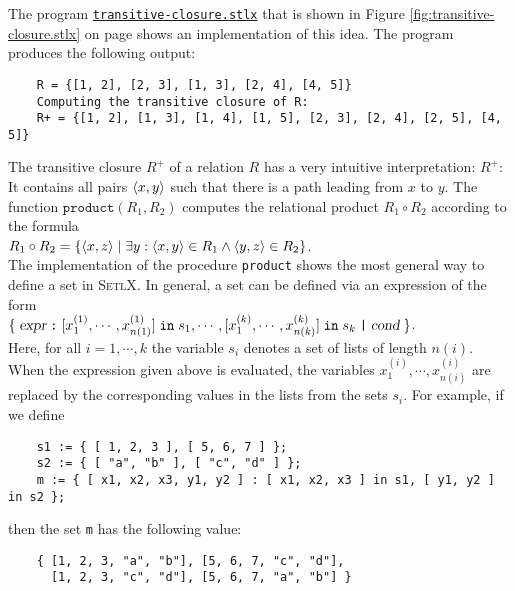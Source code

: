 \noindent
The program 
\href{https://github.com/karlstroetmann/Logik/blob/master/SetlX/transitive-closure.stlx}{\texttt{transitive-closure.stlx}}
that is shown in Figure
\ref{fig:transitive-closure.stlx} on page \pageref{fig:transitive-closure.stlx} shows an implementation of this idea.
The program produces the following output:
\begin{verbatim}
    R = {[1, 2], [2, 3], [1, 3], [2, 4], [4, 5]}
    Computing the transitive closure of R:
    R+ = {[1, 2], [1, 3], [1, 4], [1, 5], [2, 3], [2, 4], [2, 5], [4, 5]}
\end{verbatim}
The transitive closure $R^+$ of a relation $R$ has a very intuitive interpretation:
$R^+$:  It contains all pairs $\pair(x,y)$ such that there is a path leading from 
$x$ to $y$.  
The function $\texttt{product}(R_1, R_2)$ computes the relational product $R_1\circ R_2$ 
according to the formula
\\[0.2cm]
\hspace*{1.3cm}
$R_1 \circ R_2 = \{ \langle x, z \rangle \mid \exists y: \pair(x,y) \in R_1 \wedge \pair(y,z) \in R_2 \}$.
\\[0.2cm]
The implementation of the procedure \texttt{product} shows the most general way to define a set in
\textsc{SetlX}.  In general, a set can be defined via an expression of the form
\\[0.2cm]
\hspace*{1.3cm}
$\{\; \textsl{expr} \;\texttt{:}\; [x^{(1)}_1, \cdots, x^{(1)}_{n(1)}] \;\texttt{in}\; s_1,
     \cdots, [x^{(k)}_1, \cdots, x^{(k)}_{n(k)}] \;\texttt{in}\; s_k \;\texttt{|}\;
     \textsl{cond} \;\}
$.
\\[0.2cm]
Here, for all $i=1, \cdots, k$ the variable $s_i$ denotes a set of lists of length $n(i)$.  When the
expression given above is evaluated, the variables $x^{(i)}_1, \cdots, x^{(i)}_{n(i)}$ are replaced
by the corresponding values in the lists from the sets  $s_i$.  For example, if we define
\begin{verbatim}
    s1 := { [ 1, 2, 3 ], [ 5, 6, 7 ] };
    s2 := { [ "a", "b" ], [ "c", "d" ] };
    m := { [ x1, x2, x3, y1, y2 ] : [ x1, x2, x3 ] in s1, [ y1, y2 ] in s2 };
\end{verbatim}
then the set  \texttt{m} has the following value:
\begin{verbatim}
    { [1, 2, 3, "a", "b"], [5, 6, 7, "c", "d"],  
      [1, 2, 3, "c", "d"], [5, 6, 7, "a", "b"] }
\end{verbatim}


